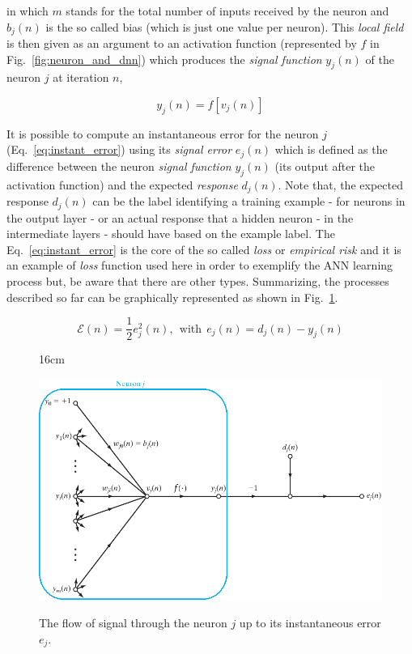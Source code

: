 in which $m$ stands for the total number of inputs received by the neuron and $b_{j}(n)$ is the so called bias (which is just one value per neuron). This \textit{local field} is then given as an argument to an activation function (represented by $\mathit{f}$ in Fig.~\ref{fig:neuron_and_dnn}) which produces the \textit{signal function} $y_{j}(n)$ of the neuron $j$ at iteration $n$,

\begin{equation}
y_{j}(n) = \mathit{f}[v_{j}(n)]
\end{equation}

It is possible to compute an instantaneous error for the neuron $j$ (Eq.~\ref{eq:instant_error}) using its \textit{signal error} $e_{j}(n)$ which is defined as the difference between the neuron \textit{signal function} $y_{j}(n)$ (its output after the activation function) and the expected \textit{response} $d_{j}(n)$. Note that, the expected response $d_{j}(n)$ can be the label identifying a training example - for neurons in the output layer - or an actual response that a hidden neuron - in the intermediate layers - should have based on the example label. The Eq.~\ref{eq:instant_error} is the core of the so called \textit{loss} or \textit{empirical risk} and it is an example of \textit{loss} function used here in order to exemplify the ANN learning process but, be aware that there are other types. Summarizing, the processes described so far can be graphically represented as shown in Fig.~\ref{fig:neuronj_signal_flow}.

\begin{equation}
\label{eq:instant_error}
\mathcal{E}(n) = \frac{1}{2} e_{j}^{2}(n), ~~\mathrm{with}~~ e_{j}(n) = d_{j}(n) - y_{j}(n)
\end{equation}

\begin{figure}[hbtp]{16cm}
	\caption{The flow of signal through the neuron $j$ up to its instantaneous error $e_{j}$.}
	\centering
	\includegraphics[scale=0.5]{ChapterAnalysis/figs/neuronj_signal_flow}
	\label{fig:neuronj_signal_flow}
\end{figure}

